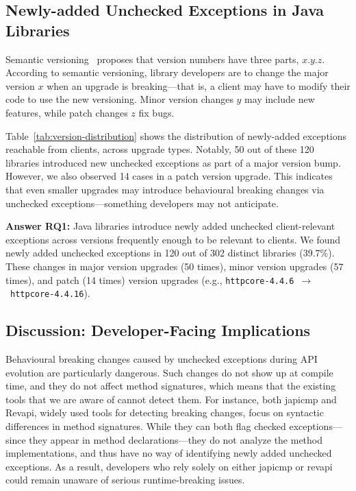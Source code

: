 \subsection{Newly-added Unchecked Exceptions in Java Libraries}
Semantic versioning~\cite{preston-werner23:_seman_version} proposes that version numbers have three parts, $x.y.z$. According to semantic versioning, library developers are to change the major version $x$ when an upgrade is breaking---that is, a client may have to modify their code to use the new versioning. Minor version changes $y$ may include new features, while patch changes $z$ fix bugs.

Table~\ref{tab:version-distribution} shows the distribution of newly-added exceptions reachable from clients, across upgrade types. Notably, 50 out of these 120 libraries introduced new unchecked exceptions as part of a major version bump. However, we also observed 14 cases in a patch version upgrade. This indicates that even smaller upgrades may introduce behavioural breaking changes via unchecked exceptions—something developers may not anticipate.

\vspace{1em}
\begin{tcolorbox}[colback=gray!10, colframe=black]
\textbf{Answer RQ1:} Java libraries introduce newly added unchecked client-relevant exceptions across versions frequently enough to be relevant to clients. We found newly added unchecked exceptions in 120 out of 302 distinct libraries (39.7\%). These changes in major version upgrades (50 times), minor version upgrades (57 times), and patch (14 times) version upgrades (e.g., \texttt{httpcore-4.4.6}~$\rightarrow$~\texttt{httpcore-4.4.16}).
\end{tcolorbox}
\vspace{1em}

\subsection{Discussion: Developer-Facing Implications}

Behavioural breaking changes caused by unchecked exceptions during API evolution are particularly dangerous. Such changes do not show up at compile time, and they do not affect method signatures, which means that the existing tools that we are aware of cannot detect them. For instance, both japicmp and Revapi, widely used tools for detecting breaking changes, focus on syntactic differences in method signatures. While they can both flag checked exceptions—since they appear in method declarations—they do not analyze the method implementations, and thus have no way of identifying newly added unchecked exceptions. As a result, developers who rely solely on either japicmp or revapi could remain unaware of serious runtime-breaking issues.

